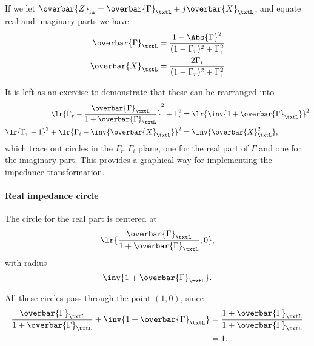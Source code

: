 If we let \( \overbar{Z}_{\textrm{in}} = \overbar{\Gamma}_\txtL + j \overbar{X}_\txtL \), and equate real and imaginary parts we have
\begin{equation}\label{eqn:uwavesDeck5SmithChartCore:420}
\begin{aligned}
\overbar{\Gamma}_\txtL &= \frac{ 1 - \Abs{\Gamma}^2 }{ (1 - \Gamma_r)^2 + \Gamma_i^2 } \\
\overbar{X}_\txtL &= \frac{2 \Gamma_i }{ (1 - \Gamma_r)^2 + \Gamma_i^2 }
\end{aligned}
\end{equation}

It is left as an exercise to demonstrate that these can be rearranged into
\begin{equation}\label{eqn:uwavesDeck5SmithChartCore:440}
\begin{aligned}
\lr{ \Gamma_r - \frac{\overbar{\Gamma}_\txtL}{1 + \overbar{\Gamma}_\txtL } }^2 + \Gamma_i^2 &= \lr{ \inv{1 + \overbar{\Gamma}_\txtL }}^2 \\
\lr{ \Gamma_r - 1 }^2 + \lr{ \Gamma_i - \inv{\overbar{X}_\txtL } }^2 &= \inv{\overbar{X}_\txtL^2},
\end{aligned}
\end{equation}
which trace out circles in the \( \Gamma_r, \Gamma_i \) plane, one for the real part of \( \Gamma \) and one for the imaginary part.  This provides a graphical way for implementing the impedance transformation.
\paragraph{Real impedance circle}
The circle for the real part is centered at
\begin{equation}\label{eqn:uwavesDeck5SmithChartCore:580}
\lr{ \frac{\overbar{\Gamma}_\txtL}{1 + \overbar{\Gamma}_\txtL }, 0 },
\end{equation}
with radius
\begin{equation}\label{eqn:uwavesDeck5SmithChartCore:600}
\inv{1 + \overbar{\Gamma}_\txtL }.
\end{equation}

All these circles pass through the point \( (1,0) \), since
\begin{equation}\label{eqn:uwavesDeck5SmithChartCore:620}
\begin{aligned}
\frac{\overbar{\Gamma}_\txtL}{1 + \overbar{\Gamma}_\txtL } + \inv{1 + \overbar{\Gamma}_\txtL }
&=
\frac{1 + \overbar{\Gamma}_\txtL}{1 + \overbar{\Gamma}_\txtL }
\\ &= 1.
\end{aligned}
\end{equation}


